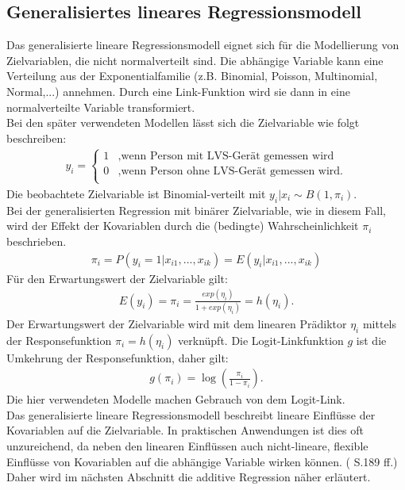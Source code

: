 \documentclass[12pt]{scrreprt}
\begin{document}
\subsection{Generalisiertes lineares Regressionsmodell}
Das generalisierte lineare Regressionsmodell eignet sich für die Modellierung von Zielvariablen, die nicht normalverteilt sind. Die abhängige Variable kann eine Verteilung aus der Exponentialfamilie (z.B. Binomial, Poisson, Multinomial, Normal,...) annehmen. Durch eine Link-Funktion wird sie dann in eine normalverteilte Variable transformiert. \\
Bei den später verwendeten Modellen lässt sich die Zielvariable wie folgt beschreiben: \\
\begin{align}
y_{i}=\begin{cases}
1 & \text{,wenn Person mit LVS-Gerät gemessen wird } \\
0 & \text{,wenn Person ohne LVS-Gerät gemessen wird.} \\
\end{cases}
\end{align}
Die beobachtete Zielvariable ist Binomial-verteilt mit $y_{i}|x_{i}\sim B(1,\pi_{i})$. \\
Bei der generalisierten Regression mit binärer Zielvariable, wie in diesem Fall, wird der Effekt der Kovariablen durch die (bedingte) Wahrscheinlichkeit $\pi_{i}$ beschrieben.
\begin{align}
\pi_{i}=P(y_{i}=1|x_{i1},...,x_{ik})=E(y_{i}|x_{i1},...,x_{ik})
\end{align}
Für den Erwartungswert der Zielvariable gilt:
\begin{align}
E(y_{i})=\pi_{i}=\frac{exp(\eta_{i})}{1+exp(\eta_{i})}=h(\eta_{i}).
\end{align}
Der Erwartungswert der Zielvariable wird mit dem linearen Prädiktor $\eta_{i}$ mittels der Responsefunktion $\pi_{i}=h(\eta_{i})$ verknüpft. Die Logit-Linkfunktion $g$ ist die Umkehrung der Responsefunktion, daher gilt:
\begin{align}
g(\pi_{i})=\log(\frac{\pi_{i}}{1-\pi_{i}}).
\end{align}
Die hier verwendeten Modelle machen Gebrauch von dem Logit-Link. \\
Das generalisierte lineare Regressionsmodell beschreibt lineare Einflüsse der Kovariablen auf die Zielvariable. In praktischen Anwendungen ist dies oft unzureichend, da neben den linearen Einflüssen auch nicht-lineare, flexible Einflüsse von Kovariablen auf die abhängige Variable wirken können. (\cite{fahrmeir2007regression} S.189 ff.) Daher wird im nächsten Abschnitt die additive Regression näher erläutert.
\end{document}

